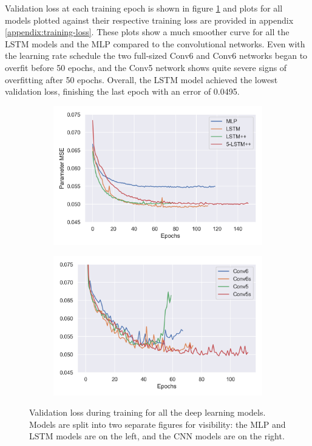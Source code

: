 Validation loss at each training epoch is shown in figure \ref{fig:training-loss} and plots for all models plotted against their respective training loss are provided in appendix \ref{appendix:training-loss}. These plots show a much smoother curve for all the LSTM models and the MLP compared to the convolutional networks. Even with the learning rate schedule the two full-sized Conv6 and Conv6 networks began to overfit before 50 epochs, and the Conv5 network shows quite severe signs of overfitting after 50 epochs. Overall, the LSTM model achieved the lowest validation loss, finishing the last epoch with an error of 0.0495.

\begin{figure}[ht]
    \centering
    \begin{subfigure}[b]{0.49\textwidth}
        \centering
        \includegraphics[width=\textwidth]{figures/inverse-synth/lstm-loss.png}
    \end{subfigure}
    \begin{subfigure}[b]{0.49\textwidth}
        \centering
        \includegraphics[width=\textwidth]{figures/inverse-synth/conv-loss.png}
    \end{subfigure}
    \caption{Validation loss during training for all the deep learning models. Models are split into two separate figures for visibility: the MLP and LSTM models are on the left, and the CNN models are on the right.}
    \label{fig:training-loss}
\end{figure}

